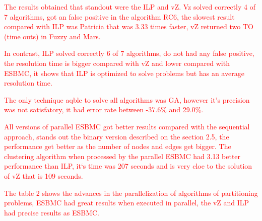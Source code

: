 \textcolor{Red}{The results obtained that standout were the ILP and vZ.
Vz solved correctly 4 of 7 algorithms, got an false positive in the algorithm RC6, the slowest result compared with ILP was Patricia that was 3.33 times faster, vZ returned two TO (time outs) in Fuzzy and Mars.}

\textcolor{Red}{In contrast, ILP solved correctly 6 of 7 algorithms, do not had any false positive, the resolution time is bigger compared with vZ and lower compared with ESBMC, it shows that ILP is optimized to solve problems but has an average resolution time.}

\textcolor{Red}{The only technique aqble to solve all algorithms was GA, however it's precision was not satisfatory, it had error rate between -37.6\% and 29.0\%.}

\textcolor{Red}{All versions of parallel ESBMC got better results compared with the sequential approach, stands out the binary version described on the section 2.5, the performance get better as the number of nodes and edges get bigger. The clustering algorithm when processed by the parallel ESBMC had 3.13 better performance than ILP, it`s time was 207 seconds and is very cloe to the solution of vZ that is 109 seconds.}

\textcolor{Red}{The table 2 shows the advances in the parallelization of algorithms of partitioning problems, ESBMC had great results when executed in parallel, the vZ and ILP had precise results as ESBMC.} 

